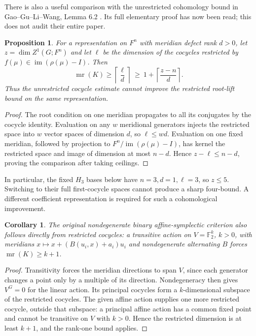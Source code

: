 \documentclass[11pt]{article}
\newtheorem{proposition}[theorem]{Proposition}
\newtheorem{corollary}[theorem]{Corollary}
\newcommand{\mr}{\operatorname{mr}}
\newcommand{\F}{\mathbb F}
\begin{document}
There is also a useful comparison with the unrestricted cohomology
bound in Gao--Gu--Li--Wang, Lemma 6.2 \cite{gglw}. Its full elementary
proof has now been read; this does not audit their entire paper.

\begin{proposition}\label{prop:comparison}
For a representation on $F^n$ with meridian defect rank $d>0$, let
$z=\dim Z^1(G;F^n)$ and let $\ell$ be the dimension of the cocycles
restricted by $f(\mu)\in\operatorname{im}(\rho(\mu)-I)$. Then
\[
 \mr(K)\ge\left\lceil\frac{\ell}{d}\right\rceil
 \ \ge\ 1+\left\lceil\frac{z-n}{d}\right\rceil.
\]
Thus the unrestricted cocycle estimate cannot improve the restricted
root-lift bound on the \emph{same} representation.
\end{proposition}
\begin{proof}
The root condition on one meridian propagates to all its conjugates
by the cocycle identity. Evaluation on any $w$ meridional generators
injects the restricted space into $w$ vector spaces of dimension $d$,
so $\ell\le wd$. Evaluation on one fixed meridian, followed by
projection to $F^n/\operatorname{im}(\rho(\mu)-I)$, has kernel the
restricted space and image of dimension at most $n-d$. Hence
$z-\ell\le n-d$, proving the comparison after taking ceilings.
\end{proof}

In particular, the fixed $H_3$ bases below have $n=3,d=1,\ell=3$,
so $z\le5$. Switching to their full first-cocycle spaces cannot
produce a sharp four-bound. A different coefficient representation
is required for such a cohomological improvement.

\begin{corollary}\label{cor:original}
The original nondegenerate binary affine-symplectic criterion also
follows directly from restricted cocycles: a transitive action on
$V=\F_2^k$, $k>0$, with meridians
$x\mapsto x+(B(u_i,x)+a_i)u_i$ and nondegenerate alternating $B$ forces
$\mr(K)\ge k+1$.
\end{corollary}
\begin{proof}
Transitivity forces the meridian directions to span $V$, since each
generator changes a point only by a multiple of its direction.
Nondegeneracy then gives $V^G=0$ for the linear action. Its principal
cocycles form a $k$-dimensional subspace of the restricted cocycles.
The given affine action supplies one more restricted cocycle, outside
that subspace: a principal affine action has a common fixed point
and cannot be transitive on $V$ with $k>0$. Hence the restricted
dimension is at least $k+1$, and the rank-one bound applies.
\end{proof}
\end{document}
